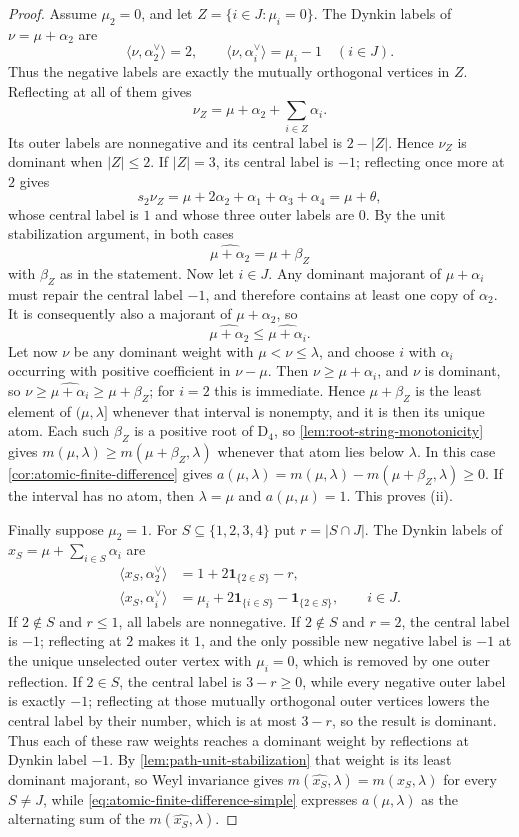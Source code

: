 \documentclass[11pt]{article}
\theoremstyle{definition}
\theoremstyle{remark}
\newcommand{\typeD}{\ensuremath{\mathrm{D}}}
\begin{document}
\begin{proof}
Assume $\mu_2=0$, and let
$Z=\{i\in J:\mu_i=0\}$.  The Dynkin labels of $\nu=\mu+\alpha_2$ are
\[
 \langle\nu,\alpha_2^\vee\rangle=2,
 \qquad
 \langle\nu,\alpha_i^\vee\rangle=\mu_i-1\quad(i\in J).
\]
Thus the negative labels are exactly the mutually orthogonal vertices in
$Z$.  Reflecting at all of them gives
\[
 \nu_Z=\mu+\alpha_2+\sum_{i\in Z}\alpha_i.
\]
Its outer labels are nonnegative and its central label is $2-|Z|$.  Hence
$\nu_Z$ is dominant when $|Z|\le2$.  If $|Z|=3$, its central label is $-1$;
reflecting once more at $2$ gives
\[
 s_2\nu_Z=\mu+2\alpha_2+\alpha_1+\alpha_3+\alpha_4
          =\mu+\theta,
\]
whose central label is $1$ and whose three outer labels are $0$.  By the unit
stabilization argument, in both cases
\[
 \widehat{\mu+\alpha_2}=\mu+\beta_Z
\]
with $\beta_Z$ as in the statement.
Now let $i\in J$.  Any dominant majorant of $\mu+\alpha_i$ must repair the
central label $-1$, and therefore contains at least one copy of $\alpha_2$.
It is consequently also a majorant of $\mu+\alpha_2$, so
\[
 \widehat{\mu+\alpha_2}\le\widehat{\mu+\alpha_i}.
\]
Let now $\nu$ be any dominant weight with $\mu<\nu\le\lambda$, and choose $i$
with $\alpha_i$ occurring with positive coefficient in $\nu-\mu$.  Then
$\nu\ge\mu+\alpha_i$, and $\nu$ is dominant, so
$\nu\ge\widehat{\mu+\alpha_i}\ge\mu+\beta_Z$; for $i=2$ this is immediate.
Hence $\mu+\beta_Z$ is the least element of $(\mu,\lambda]$ whenever that
interval is nonempty, and it is then its unique atom.  Each such $\beta_Z$ is
a positive root of $\typeD_4$, so
\cref{lem:root-string-monotonicity} gives
$m(\mu,\lambda)\ge m(\mu+\beta_Z,\lambda)$ whenever that atom lies below
$\lambda$.  In this case \cref{cor:atomic-finite-difference} gives
$a(\mu,\lambda)=m(\mu,\lambda)-m(\mu+\beta_Z,\lambda)\ge0$.
If the interval has no atom, then $\lambda=\mu$ and $a(\mu,\mu)=1$.
This proves (ii).

Finally suppose $\mu_2=1$.  For
$S\subseteq\{1,2,3,4\}$ put $r=|S\cap J|$.  The Dynkin labels of
$x_S=\mu+\sum_{i\in S}\alpha_i$ are
\begin{align*}
 \langle x_S,\alpha_2^\vee\rangle
    &=1+2\mathbf 1_{\{2\in S\}}-r,\\
 \langle x_S,\alpha_i^\vee\rangle
    &=\mu_i+2\mathbf 1_{\{i\in S\}}-
      \mathbf 1_{\{2\in S\}},\qquad i\in J.
\end{align*}
If $2\notin S$ and $r\le1$, all labels are nonnegative.  If $2\notin S$
and $r=2$, the central label is $-1$; reflecting at $2$ makes it $1$, and the
only possible new negative label is $-1$ at the unique unselected outer
vertex with $\mu_i=0$, which is removed by one outer reflection.  If
$2\in S$, the central label is $3-r\ge0$, while every negative outer label is
exactly $-1$; reflecting at those mutually orthogonal outer vertices lowers
the central label by their number, which is at most $3-r$, so the result is
dominant.  Thus each of these raw weights reaches a dominant weight by
reflections at Dynkin label $-1$.  By \cref{lem:path-unit-stabilization}
that weight is its least dominant majorant, so Weyl invariance gives
$m(\widehat{x_S},\lambda)=m(x_S,\lambda)$ for every $S\ne J$, while
\eqref{eq:atomic-finite-difference-simple} expresses $a(\mu,\lambda)$ as the
alternating sum of the $m(\widehat{x_S},\lambda)$.


\end{proof}
\end{document}
